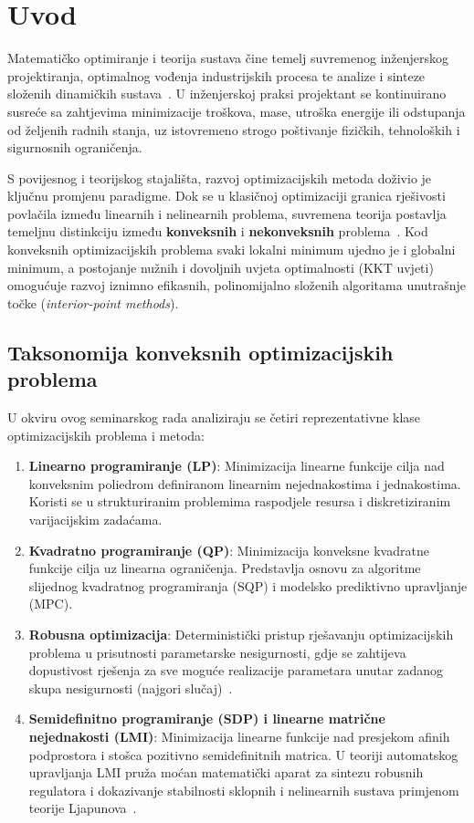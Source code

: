 \section{Uvod}

Matematičko optimiranje i teorija sustava čine temelj suvremenog inženjerskog projektiranja, optimalnog vođenja industrijskih procesa te analize i sinteze složenih dinamičkih sustava~\cite{boyd2004convex,nocedal2006numerical}. U inženjerskoj praksi projektant se kontinuirano susreće sa zahtjevima minimizacije troškova, mase, utroška energije ili odstupanja od željenih radnih stanja, uz istovremeno strogo poštivanje fizičkih, tehnoloških i sigurnosnih ograničenja.

S povijesnog i teorijskog stajališta, razvoj optimizacijskih metoda doživio je ključnu promjenu paradigme. Dok se u klasičnoj optimizaciji granica rješivosti povlačila između linearnih i nelinearnih problema, suvremena teorija postavlja temeljnu distinkciju između \textbf{konveksnih} i \textbf{nekonveksnih} problema~\cite{boyd2004convex,jokic2024predavanja}. Kod konveksnih optimizacijskih problema svaki lokalni minimum ujedno je i globalni minimum, a postojanje nužnih i dovoljnih uvjeta optimalnosti (KKT uvjeti) omogućuje razvoj iznimno efikasnih, polinomijalno složenih algoritama unutrašnje točke (\textit{interior-point methods}).

\subsection{Taksonomija konveksnih optimizacijskih problema}

U okviru ovog seminarskog rada analiziraju se četiri reprezentativne klase optimizacijskih problema i metoda:
\begin{enumerate}
    \item \textbf{Linearno programiranje (LP)}: Minimizacija linearne funkcije cilja nad konveksnim poliedrom definiranom linearnim nejednakostima i jednakostima. Koristi se u strukturiranim problemima raspodjele resursa i diskretiziranim varijacijskim zadaćama.
    \item \textbf{Kvadratno programiranje (QP)}: Minimizacija konveksne kvadratne funkcije cilja uz linearna ograničenja. Predstavlja osnovu za algoritme slijednog kvadratnog programiranja (SQP) i modelsko prediktivno upravljanje (MPC).
    \item \textbf{Robusna optimizacija}: Deterministički pristup rješavanju optimizacijskih problema u prisutnosti parametarske nesigurnosti, gdje se zahtijeva dopustivost rješenja za sve moguće realizacije parametara unutar zadanog skupa nesigurnosti (najgori slučaj)~\cite{bental2009robust}.
    \item \textbf{Semidefinitno programiranje (SDP) i linearne matrične nejednakosti (LMI)}: Minimizacija linearne funkcije nad presjekom afinih podprostora i stošca pozitivno semidefinitnih matrica. U teoriji automatskog upravljanja LMI pruža moćan matematički aparat za sintezu robusnih regulatora i dokazivanje stabilnosti sklopnih i nelinearnih sustava primjenom teorije Ljapunova~\cite{boyd1994lmi,liberzon2003switching}.
\end{enumerate}

